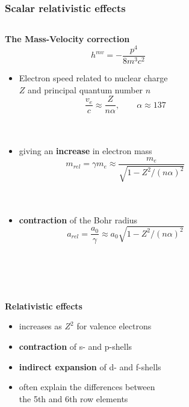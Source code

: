 \documentclass[mathserif,8pt]{beamer}
\begin{document}
\begin{frame}
    \frametitle{Scalar relativistic effects}
    \begin{columns}
    \begin{column}{0.45\textwidth}
    \centering
    \textbf{The Mass-Velocity correction}
		\begin{equation}
		    \nonumber
		    h^{mv} = -\frac{p^4}{8m^3c^2}
		\end{equation}
    \begin{itemize}
	\item	Electron speed related to nuclear charge\\
		$Z$ and principal quantum number $n$
		\begin{equation}
		    \nonumber
		    \frac{v_e}{c} \approx \frac{Z}{n\alpha},\qquad \alpha \approx 137
		\end{equation}
		\ \\
		\ \\
	\item	giving an \textbf{increase} in electron mass
		\begin{equation}
		    \nonumber
		    m_{rel} = \gamma m_e \approx \frac{m_e}{\sqrt{1-Z^2/(n\alpha)^2}}
		\end{equation}
		\ \\
		\ \\
	\item	\textbf{contraction} of the Bohr radius
		\begin{equation}
		    \nonumber
		    a_{rel} = \frac{a_0}{\gamma} \approx a_0\sqrt{1-Z^2/(n\alpha)^2}
		\end{equation}
		\ \\
		\ \\
    \end{itemize}
    \ \\
    \ \\
    \pause
    \textbf{Relativistic effects}
    \begin{itemize}
	\item   increases as $Z^2$ for valence electrons
	\item   \textbf{contraction} of s- and p-shells
	\item   \textbf{indirect expansion} of d- and f-shells
	\item   often explain the differences between\\ 
	        the 5th and 6th row elements
    \end{itemize}
    \end{column}
    \begin{column}{0.55\textwidth}

\end{column}
\end{columns}
\end{frame}
\end{document}
